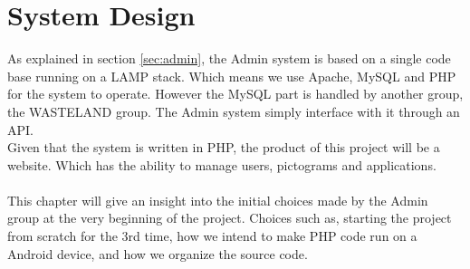 \chapter{System Design}
\label{chap:systemDesign}
As explained in section \vref{sec:admin}, the Admin system is based on a single code base running on a LAMP stack. Which means we use Apache, MySQL and PHP for the system to operate. However the MySQL part is handled by another group, the WASTELAND group. The Admin system simply interface with it through an API.\\
Given that the system is written in PHP, the product of this project will be a website. Which has the ability to manage users, pictograms and applications.\\
\\
This chapter will give an insight into the initial choices made by the Admin group at the very beginning of the project. Choices such as, starting the project from scratch for the 3rd time, how we intend to make PHP code run on a Android device, and how we organize the source code.


